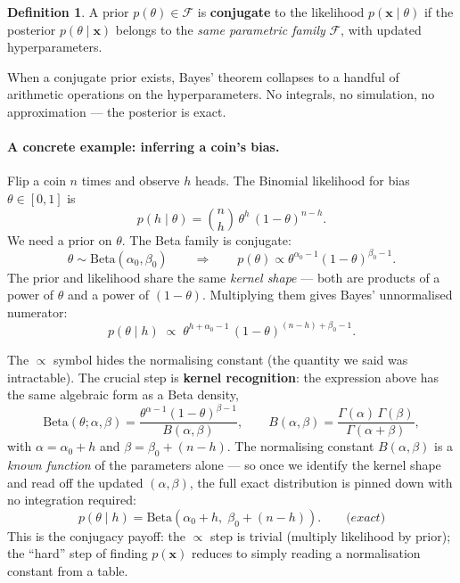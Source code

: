 \documentclass[11pt, a4paper]{article}
\theoremstyle{definition}
\newtheorem{definition}{Definition}[section]
\begin{document}
\begin{definition}
  A prior $p(\theta) \in \mathcal{F}$ is \textbf{conjugate} to the likelihood
  $p(\mathbf{x} \mid \theta)$ if the posterior $p(\theta \mid \mathbf{x})$
  belongs to the \emph{same parametric family} $\mathcal{F}$, with
  updated hyperparameters.
\end{definition}

When a conjugate prior exists, Bayes' theorem collapses to a handful of
arithmetic operations on the hyperparameters.  No integrals, no simulation,
no approximation — the posterior is exact.

\paragraph{A concrete example: inferring a coin's bias.}

Flip a coin $n$ times and observe $h$ heads.  The Binomial likelihood for
bias $\theta\in[0,1]$ is
\[
  p(h \mid \theta) = \binom{n}{h}\,\theta^h\,(1-\theta)^{n-h}.
\]
We need a prior on $\theta$.  The Beta family is conjugate:
\[
  \theta \sim \mathrm{Beta}(\alpha_0, \beta_0)
  \qquad\Longrightarrow\qquad
  p(\theta) \propto \theta^{\alpha_0 - 1}(1-\theta)^{\beta_0 - 1}.
\]
The prior and likelihood share the same \emph{kernel shape} — both are
products of a power of $\theta$ and a power of $(1-\theta)$.
Multiplying them gives Bayes' unnormalised numerator:
\[
  p(\theta \mid h)
  \;\propto\;
  \theta^{h + \alpha_0 - 1}\,(1-\theta)^{(n-h) + \beta_0 - 1}.
\]

The $\propto$ symbol hides the normalising constant (the quantity we said
was intractable).  The crucial step is \textbf{kernel recognition}:
the expression above has the same algebraic form as a Beta density,
\[
  \mathrm{Beta}(\theta;\alpha,\beta)
  = \frac{\theta^{\alpha-1}(1-\theta)^{\beta-1}}{B(\alpha,\beta)},
  \qquad
  B(\alpha,\beta) = \frac{\Gamma(\alpha)\,\Gamma(\beta)}{\Gamma(\alpha+\beta)},
\]
with $\alpha = \alpha_0+h$ and $\beta = \beta_0+(n-h)$.
The normalising constant $B(\alpha,\beta)$ is a \emph{known function} of the
parameters alone — so once we identify the kernel shape and read off the
updated $(\alpha,\beta)$, the full exact distribution is pinned down with no
integration required:
\[
  p(\theta \mid h) = \mathrm{Beta}(\alpha_0 + h,\;\beta_0 + (n-h)). \qquad\textit{(exact)}
\]
This is the conjugacy payoff: the $\propto$ step is trivial (multiply
likelihood by prior); the ``hard'' step of finding $p(\mathbf{x})$ reduces
to simply reading a normalisation constant from a table.
\end{document}
